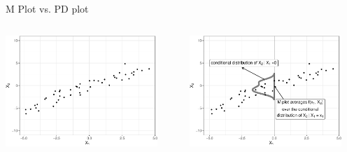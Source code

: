 \documentclass[11pt,compress,t,notes=noshow, aspectratio=169, xcolor=table]{beamer}
\begin{document}
\begin{frame}{M Plot vs. PD plot}

\begin{columns}[T]
\begin{column}{0.5\textwidth}
\centering
\includegraphics[width=0.9\textwidth]{figure/ale_scatter}
\end{column}
\begin{column}{0.5\textwidth}
\centering
\includegraphics[width=0.9\textwidth]{figure/ale_mplot}
\end{column}
\end{columns}



\end{frame}
\end{document}
